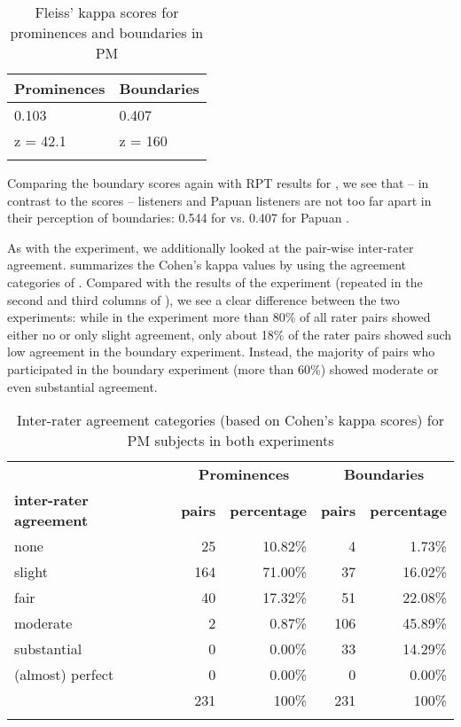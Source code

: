 \documentclass[output=paper
,modfonts
,nonflat]{langsci/langscibook}
\begin{document}
\begin{table}
\begin{tabularx}{\textwidth}{XX}
	\lsptoprule
	\bfseries Prominences & \bfseries Boundaries\\
	\midrule
	0.103 & 0.407\\
	{z = 42.1} & {z = 160}\\
	\lspbottomrule
\end{tabularx}
\caption{Fleiss’ kappa scores for prominences and boundaries in PM}
\label{t3}
\end{table}

Comparing the boundary scores again with  RPT results for , we see that – in contrast to the  scores –  listeners and Papuan  listeners are not too far apart in their perception of boundaries: 0.544 for  vs. 0.407 for Papuan .

\noindent
As with the  experiment, we additionally looked at the pair-wise inter-rater agreement.  summarizes the Cohen’s kappa values by using the agreement categories of \citet{Landis1977}. Compared with the results of the  experiment (repeated in the second and third columns of ), we see a clear difference between the two experiments: while in the  experiment more than 80\% of all rater pairs showed either no or only slight agreement, only about 18\% of the rater pairs showed such low agreement in the boundary experiment. Instead, the majority of pairs who participated in the boundary experiment (more than 60\%) showed moderate or even substantial agreement.

\begin{table}
	\begin{tabularx}{\textwidth}{Xrrrr}
		\lsptoprule
		& \multicolumn{2}{c}{\bfseries Prominences} & \multicolumn{2}{c}{\bfseries Boundaries}\\
		\bfseries inter-rater agreement & \bfseries pairs & \bfseries percentage & \bfseries pairs & \bfseries percentage\\
		\midrule
		none & 25 & 10.82\% & 4 & 1.73\%\\
		slight & 164 & 71.00\% & 37 & 16.02\%\\
		fair & 40 & 17.32\% & 51 & 22.08\%\\
		moderate & 2 & 0.87\% & 106 & 45.89\%\\
		substantial & 0 & 0.00\% & 33 & 14.29\%\\
		(almost) perfect & 0 & 0.00\% & 0 & 0.00\%\\
		\midrule
		& 231 & 100\% & 231 & 100\%\\
		\lspbottomrule
	\end{tabularx}
	\caption{Inter-rater agreement categories (based on Cohen’s kappa scores) for PM subjects in both experiments}
	\label{t4}
\end{table}
\end{document}
